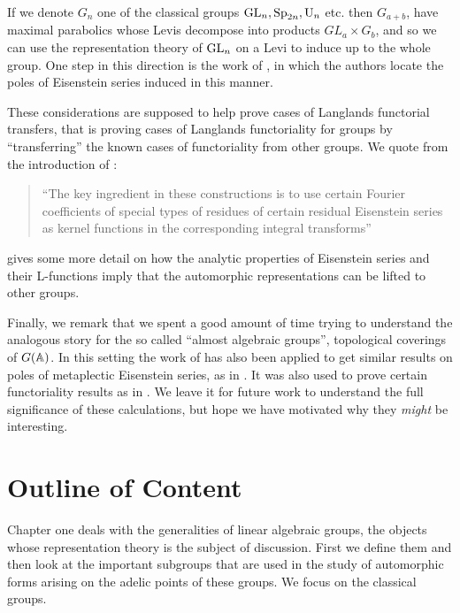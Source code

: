 If we denote \(G_n\) one of the classical groups \(\operatorname{GL}_n, \operatorname{Sp}_{2n}, \mathrm{U}_n\) etc. then \(G_{a+b}\), have maximal parabolics whose Levis decompose into products \(GL_a\times G_{b}\), and so we can use the representation theory of \(\operatorname{GL}_n\) on a Levi to induce up to the whole group. One step in this direction is the work of \cite{jiangPolesCertainResidual2013}, in which the authors locate the poles of Eisenstein series induced in this manner. 

These considerations are supposed to help prove cases of Langlands functorial transfers, that is proving cases of Langlands functoriality for groups by ``transferring'' the known cases of functoriality from other groups. We quote from the introduction of \cite{jiangPolesCertainResidual2013}:

\begin{quote}
	``The key ingredient in these constructions is to use certain Fourier coefficients of special types of residues of certain residual Eisenstein series as kernel functions in the corresponding integral transforms''
\end{quote}
\cite{bumpRankinSelbergMethodIntroduction2011} gives some more detail on how the analytic properties of Eisenstein series and their L-functions imply that the automorphic representations can be lifted to other groups. 


Finally, we remark that we spent a good amount of time trying to understand the analogous story for the so called ``almost algebraic groups'', topological coverings of \(G(\A)\). In this setting the work of \cite{jiangPolesCertainResidual2013} has also been applied to get similar results on poles of metaplectic Eisenstein series, as in \cite{kaplanDoublingConstructionsComplete2021}. It was also used to prove certain functoriality results as in \cite{caiDoublingConstructionsGlobal2024}. We leave it for future work to understand the full significance of these calculations, but hope we have motivated why they \textit{might} be interesting.

\section*{Outline of Content}
Chapter one deals with the generalities of linear algebraic groups, the objects whose representation theory is the subject of discussion. First we define them and then look at the important subgroups that are used in the study of automorphic forms arising on the adelic points of these groups. We focus on the classical groups.

